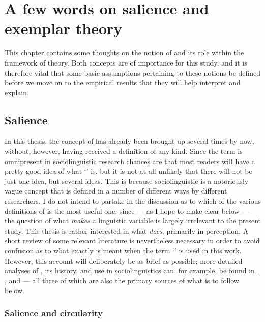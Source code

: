 \chapter{A few words on salience and exemplar theory}
\label{ch.sal}

This chapter contains some thoughts on the notion of  and its role within the framework of  theory.
Both concepts are of  importance for this study, and it is therefore vital that some basic assumptions pertaining to these notions be defined before we move on to the empirical results that they will help interpret and explain.

	\section{Salience}
	\label{sec.sal.sal}

In this thesis, the concept of  has already been brought up several times by now, without, however, having received a definition of any kind.
Since the term is omnipresent in sociolinguistic research chances are that most readers will have a pretty good idea of what `' is, but it is not at all unlikely that there will not be just one idea, but several ideas.
This is because sociolinguistic  is a notoriously vague concept that is defined in a number of different ways by different researchers.
I do not intend to partake in the discussion as to which of the various definitions of  is the most useful one, since --- as I hope to make clear below --- the question of what \emph{makes} a linguistic variable  is largely irrelevant to the present study.
This thesis is rather interested in what  \emph{does}, primarily in perception.
A short review of some relevant literature is nevertheless necessary in order to avoid confusion as to what exactly is meant when the term `' is used in this work.
However, this account will deliberately be as brief as possible; more detailed analyses of , its history, and use in sociolinguistics can, for example, be found in \cite{kerswillwilliams2002}, \cite{racz2013}, and \cite{auer2014} --- all three of which are also the primary sources of what is to follow below.

		\subsection{Salience and circularity}
		\label{sec.sal.sal.circle}

